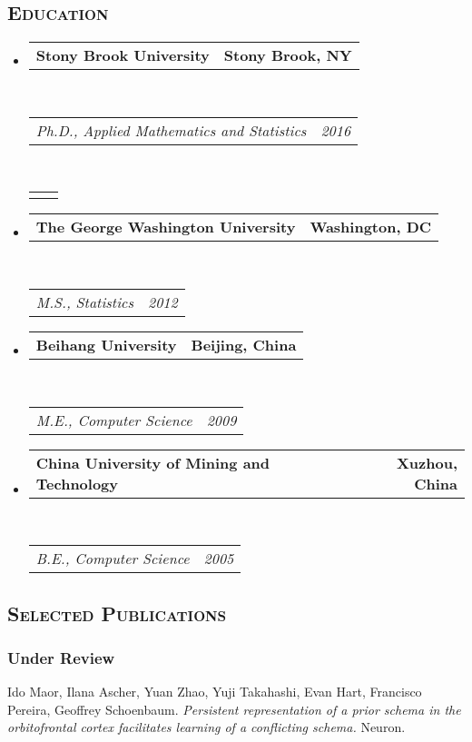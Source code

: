\documentclass[11pt]{article}
\makeatletter
\newcommand{\headerrow}[2]
{\begin{tabular*}{\linewidth}{l@{\extracolsep{\fill}}r}
	#1 &
	#2 \\
\end{tabular*}}
\makeatother
\begin{document}
\subsection*{\textsc{Education}}
\begin{itemize}
	\parskip=0.1em
    
  	\item 
	\headerrow
		{\textbf{Stony Brook University}}
		{\textbf{Stony Brook, NY}}
	\\
	\headerrow
		{\emph{Ph.D., Applied Mathematics and Statistics}}
		{\emph{2016}}
		\\
	\headerrow
	{
	\quad {\small Advisors: Dr. Hongshik Ahn and Dr. Il Memming Park}
	}
	{}
	\item 
	\headerrow
		{\textbf{The George Washington University}}
		{\textbf{Washington, DC}}
	\\
	\headerrow
		{\emph{M.S., Statistics}}
		{\emph{2012}}
			\item 
	\headerrow
		{\textbf{Beihang University}}
		{\textbf{Beijing, China}}
	\\
	\headerrow
		{\emph{M.E., Computer Science}}
		{\emph{2009}}
    {}
	\item 
	\headerrow
		{\textbf{China University of Mining and Technology}}
		{\textbf{Xuzhou, China}}
	\\
	\headerrow
		{\emph{B.E., Computer Science}}
		{\emph{2005}}
\end{itemize}


\subsection*{\textsc{Selected Publications}}

\subsubsection*{Under Review}
\begin{enumerate}[label={[\arabic*]}]
    \item Ido Maor, Ilana Ascher, Yuan Zhao, Yuji Takahashi, Evan Hart, Francisco Pereira, Geoffrey Schoenbaum. \textit{Persistent representation of a prior schema in the orbitofrontal cortex facilitates learning of a conflicting schema.}
          Neuron.
\end{enumerate}
\end{document}
